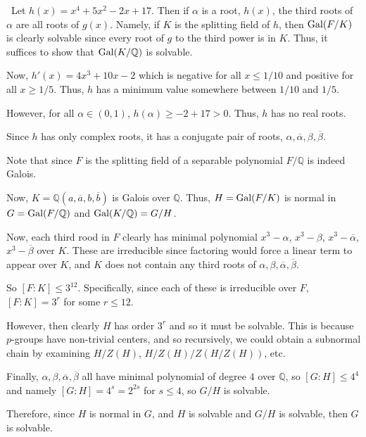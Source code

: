 \documentclass[12pt]{AlgebraQual}
\begin{document}
\begin{solution}$\,$
Let $h(x)=x^4+5x^2-2x+17$. Then if $\alpha$ is a root, $h(x)$, the third roots of $\alpha$ are all roots of $g(x).$ Namely, if $K$ is the splitting field of $h$, then $\text{Gal}(F/K)$ is clearly solvable since every root of $g$ to the third power is in $K$. Thus, it suffices to show that $\text{Gal}(K/\mathbb{Q})$ is solvable.

Now, $h'(x)=4x^3+10x-2$ which is negative for all $x\le 1/10$ and positive for all $x\ge1/5$. Thus, $h$ has a minimum value somewhere between $1/10$ and $1/5$.

However, for all $\alpha\in(0,1)$, $h(\alpha)\ge -2+17>0.$ Thus, $h$ has no real roots.

Since $h$ has only complex roots, it has a conjugate pair of roots, $\alpha,\overline{\alpha},\beta,\overline{\beta}.$

Note that since $F$ is the splitting field of a separable polynomial $F/\mathbb{Q}$ is indeed Galois.

Now, $K=\mathbb{Q}(a,\overline{a},b,\overline{b})$ is Galois over $\mathbb{Q}$. Thus, $H=\text{Gal}(F/K)$ is normal in $G=\text{Gal}(F/\mathbb{Q})$ and $\text{Gal}(K/\mathbb{Q})=G/H$.

Now, each third rood in $F$ clearly has minimal polynomial $x^3-\alpha$, $x^3-\beta$, $x^3-\overline{\alpha}$, $x^3-\overline{\beta}$ over $K$. These are irreducible since factoring would force a linear term to appear over $K$, and $K$ does not contain any third roots of $\alpha,\beta,\overline{\alpha},\overline{\beta}$.

So $[F:K]\le 3^{12}$. Specifically, since each of these is irreducible over $F$, $[F:K]=3^r$ for some $r\le12$.

However, then clearly $H$ has order $3^r$ and so it must be solvable. This is because $p$-groups have non-trivial centers, and so recursively, we could obtain a subnormal chain by examining $H/Z(H)$, $H/Z(H)/Z(H/Z(H))$, etc.

Finally, $\alpha,\beta,\overline{\alpha}, \overline{\beta}$ all have minimal polynomial of degree $4$ over $\mathbb{Q}$, so $[G:H]\le 4^4$ and namely $[G:H]=4^s=2^{2s}$ for $s\le 4$, so $G/H$ is solvable.

Therefore, since $H$ is normal in $G$, and $H$ is solvable and $G/H$ is solvable, then $G$ is solvable.

\end{solution}
\end{document}
